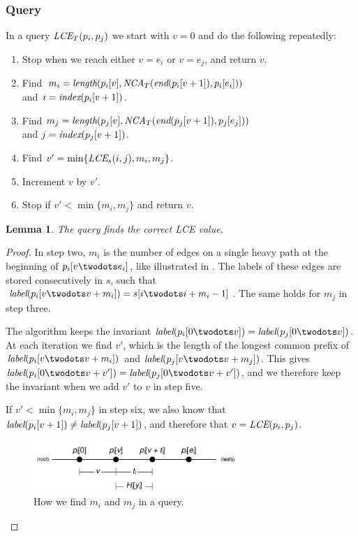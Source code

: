 \documentclass[a4]{article}
\newcommand*{\pref}{\prettyref}
\newtheorem{lemma}{Lemma}
\begin{document}
\subsubsection{Query}

In a  query $\textit{LCE}_T(p_i,p_j)$ we start with $v=0$ and do the following repeatedly:
\begin{enumerate}
\item Stop when we reach either $v=e_i$ or $v=e_j$, and return $v$.
\item Find $m_i = \textit{length}(p_i[v], \textit{NCA}_T(\textit{end}(p_i[v+1]), p_i[e_i]))$ \\ and $i=\textit{index}(p_i[v+1])$.
\item Find $m_j = \textit{length}(p_j[v], \textit{NCA}_T(\textit{end}(p_j[v+1]), p_j[e_j]))$ \\ and $j=\textit{index}(p_j[v+1])$.
\item Find $v'=\min\{\textit{LCE}_s(i,j),m_i,m_j\}$.
\item Increment $v$ by $v'$.
\item Stop if $v'<\min\{m_i,m_j\}$ and return $v$.
\end{enumerate}

\begin{lemma}
The  query finds the correct LCE value.
\end{lemma}
\begin{proof}
In step two, $m_i$ is the number of edges on a single heavy path at the beginning of $p_i[v\twodots e_i]$, like illustrated in \pref{fig:tree-heavy-query}. The labels of these edges are stored consecutively in $s$, such that $\zlabel(p_i[v\twodots v+m_i])=s[i\twodots i + m_i-1]$. The same holds for $m_j$ in step three.

The algorithm keeps the invariant $\zlabel(p_i[0\twodots v]) = \zlabel(p_j[0\twodots v])$. At each iteration we find $v'$, which is the length of the longest common prefix of $\zlabel(p_i[v\twodots v+m_i])$ and $\zlabel(p_j[v\twodots v+m_j])$. This gives $\zlabel(p_i[0\twodots v+v']) = \zlabel(p_j[0\twodots v+v'])$, and we therefore keep the invariant when we add $v'$ to $v$ in step five.

If $v'<\min\{m_i,m_j\}$ in step six, we also know that $\textit{label}(p_i[v+1]) \neq \textit{label}(p_j[v+1])$, and therefore that $v=\textit{LCE}(p_i,p_j)$.

\begin{figure}[tp]
    \begin{center}
        \includegraphics[width=0.7\textwidth,page=2]{tree-fingerprint.pdf}
    \end{center}
    \caption{\label{fig:tree-heavy-query}How we find $m_i$ and $m_j$ in a  query.}
\end{figure}
\end{proof}
\end{document}
